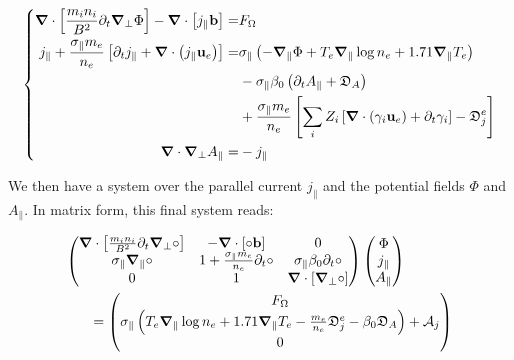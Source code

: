 \begin{equation}
	\label{eq:S3X_vorticityEquation_FullElectromagnetic}
	\left\{
	\begin{aligned}
		\grad\cdot\left[\frac{m_i n_i}{ B^2}\partial_t\grad_\perp\Phi\right] - \grad\cdot\left[j_\parallel\mathbf{b}\right]=& F_\Omega \\
		j_\parallel + \frac{\sigma_\parallel m_e}{n_e}\left[\partial_t j_\parallel + \grad\cdot\left(j_\parallel\mathbf{u}_e\right)\right] =& \sigma_\parallel \left(-\grad_\parallel\Phi + T_e\grad_\parallel\log n_e + 1.71\grad_\parallel T_e\right) \\ 
		& - \sigma_\parallel\beta_0\left(\partial_t A_\parallel + \mathfrak{D}_A \right) \\		
		& + \frac{\sigma_\parallel m_e}{n_e}\left[\sum_iZ_i\left[\grad\cdot\left(\gamma_i\mathbf{u}_e \right) + \partial_t \gamma_i\right] - \mathfrak{D}_j^e\right] \\
		\hspace{3cm}\grad\cdot\grad_\perp A_\parallel =& -j_\parallel
	\end{aligned}
	\right.
\end{equation}

We then have a system over the parallel current $j_\parallel$ and the potential fields $\Phi$ and $A_\parallel$. In matrix form, this final system reads:

\begin{align}
	\makebox[0.8\textwidth][l]{$\displaystyle
		\begin{pmatrix}
			\grad\cdot\left[\frac{m_i n_i}{ B^2}\partial_t\grad_\perp\circ\right] & 
			- \grad\cdot\left[\circ\mathbf{b}\right] & 
			0 \\
			\sigma_\parallel\grad_\parallel\circ &
			1 + \frac{\sigma_\parallel m_e}{n_e}\partial_t \circ &
			\sigma_\parallel\beta_0\partial_t\circ \\
			0 & 1 & \grad\cdot\left[\grad_\perp\circ\right]
		\end{pmatrix}
		\begin{pmatrix}
			\Phi \\ j_\parallel \\ A_\parallel
		\end{pmatrix}
		$} \nonumber \\	
	\makebox[0.8\textwidth][r]{$\displaystyle
		= \begin{pmatrix}
			F_\Omega \\
			\sigma_\parallel\left(T_e\grad_\parallel\log n_e + 1.71\grad_\parallel T_e - \frac{m_e}{n_e}\mathfrak{D}_j^e - \beta_0\mathfrak{D}_A \right) + \mathcal{A}_j \\
			0
		\end{pmatrix}
		$} \label{eq:S3X_vorticityEquation_ElectronInertiaElectromagnetism_matrix}
\end{align}

